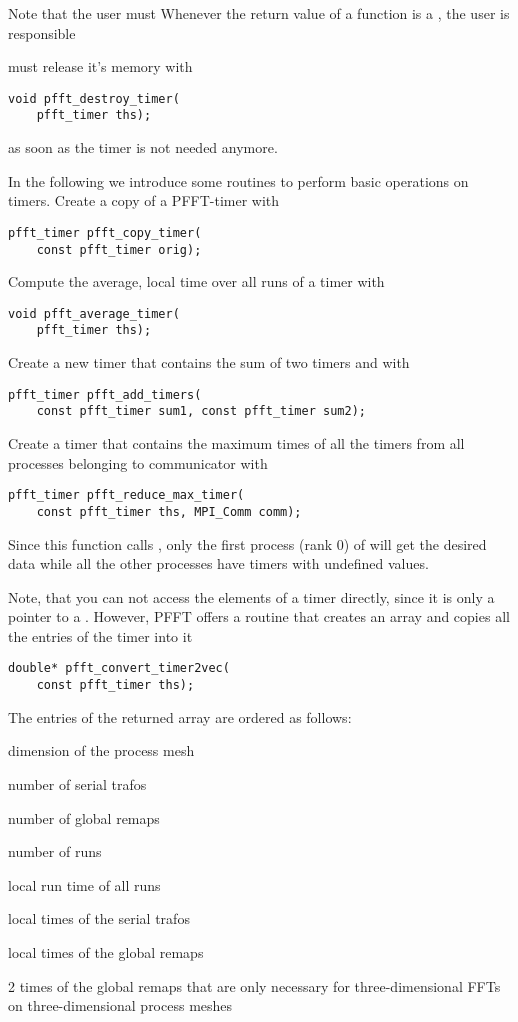 Note that the user must Whenever the return value of a function is a , the user is responsible 


must release it's memory with
\begin{lstlisting}
void pfft_destroy_timer(
    pfft_timer ths);
\end{lstlisting}
as soon as the timer is not needed anymore. 

In the following we introduce some routines to perform basic operations on timers.
Create a copy of a PFFT-timer  with
\begin{lstlisting}
pfft_timer pfft_copy_timer(
    const pfft_timer orig);
\end{lstlisting}
Compute the average, local time over all runs of a timer  with
\begin{lstlisting}
void pfft_average_timer(
    pfft_timer ths);
\end{lstlisting}
Create a new timer that contains the sum of two timers  and  with
\begin{lstlisting}
pfft_timer pfft_add_timers(
    const pfft_timer sum1, const pfft_timer sum2);
\end{lstlisting}
Create a timer that contains the maximum times of all the timers  from all processes belonging to communicator  with
\begin{lstlisting}
pfft_timer pfft_reduce_max_timer(
    const pfft_timer ths, MPI_Comm comm);
\end{lstlisting}
Since this function calls , only the first process (rank 0) of  will get the desired data while all
the other processes have timers with undefined values.

Note, that you can not access the elements of a timer directly, since it is only a pointer to a .
However, PFFT offers a routine that creates an array and copies all the entries of the timer into it
\begin{lstlisting}
double* pfft_convert_timer2vec(
    const pfft_timer ths);
\end{lstlisting}
The entries of the returned array are ordered as follows:
\begin{compactitem}
  \item dimension of the process mesh 
  \item number of serial trafos 
  \item number of global remaps 
  \item number of  runs 
  \item local run time of all runs
  \item {} local times of the serial trafos
  \item {} local times of the global remaps
  \item 2 times of the global remaps that are only necessary for three-dimensional FFTs on three-dimensional process meshes
\end{compactitem}

